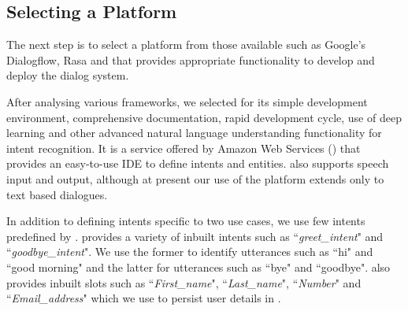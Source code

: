 \documentclass[runningheads]{llncs}
\let\svthefootnote\thefootnote
\newcommand\colorfootnote[2][black]{\def\thefootnote{\color{#1}\svthefootnote}%
  \footnote{\color{#1}#2}\def\thefootnote{\color{black}\svthefootnote}}
\newcommand{\MUDITA}[1]{\protect\colorfootnote[blue]{{\textbf{[MUDITA: #1]}}}}
\begin{document}
\subsection{Selecting a Platform}\label{subsec:selecting a platform}
The next step is to select a platform from those available such as Google's Dialogflow, Rasa and \aws \lex that provides appropriate functionality to develop and deploy the dialog system. 

After analysing various frameworks, we selected \lex for its simple development environment, comprehensive documentation, rapid development cycle, use of deep learning and other advanced natural language understanding functionality for intent recognition. It is a service offered by Amazon Web Services (\aws) that provides an easy-to-use IDE to define intents and entities.
\lex also supports speech input and output, although at present our use of the platform extends only to text based dialogues. 

In addition to defining intents specific to two use cases, we use few intents predefined by \lex. \lex provides a variety of inbuilt intents such as ``\textit{greet\_intent}" and ``\textit{goodbye\_intent}". We use the former to identify utterances such as ``hi" and ``good morning" and the latter for utterances such as ``bye" and ``goodbye".
\lex also provides inbuilt slots such as ``\textit{First\_name}", ``\textit{Last\_name}", ``\textit{Number}" and ``\textit{Email\_address}" which we use to persist user details in \ff. 
\end{document}
